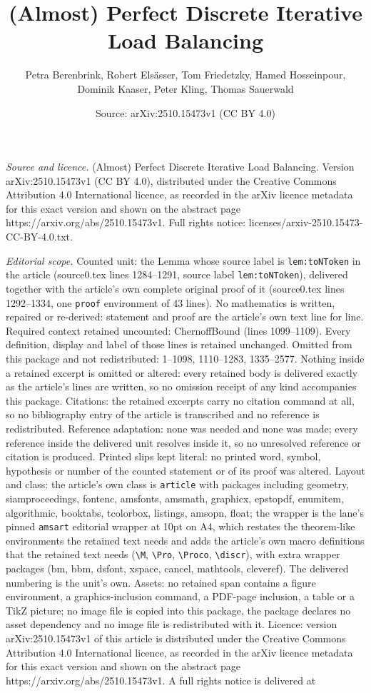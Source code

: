 \documentclass[10pt,a4paper]{amsart}
\title[(Almost) Perfect Discrete Iterative Load Balancing]{(Almost) Perfect Discrete Iterative Load Balancing}
\author{Petra Berenbrink, Robert Els\"asser, Tom Friedetzky, Hamed Hosseinpour, Dominik Kaaser, Peter Kling, Thomas Sauerwald}
\date{Source: arXiv:2510.15473v1 (CC BY 4.0)}
\begin{document}
\maketitle

\noindent\emph{Source and licence.} (Almost) Perfect Discrete Iterative Load Balancing. Version arXiv:2510.15473v1 (CC BY 4.0), distributed under the Creative Commons Attribution 4.0 International licence, as recorded in the arXiv licence metadata for this exact version and shown on the abstract page https://arxiv.org/abs/2510.15473v1. Full rights notice: licenses/arxiv-2510.15473-CC-BY-4.0.txt.\par\smallskip

\noindent\textit{Editorial scope.} Counted unit: the Lemma whose source label is \texttt{lem:toNToken} in the article (source0.tex lines 1284--1291, source label \texttt{lem:toNToken}), delivered together with the article's own complete original proof of it (source0.tex lines 1292--1334, one \texttt{proof} environment of 43 lines). No mathematics is written, repaired or re-derived: statement and proof are the article's own text line for line. Required context retained uncounted: ChernoffBound (lines 1099--1109). Every definition, display and label of those lines is retained unchanged. Omitted from this package and not redistributed: 1--1098, 1110--1283, 1335--2577. Nothing inside a retained excerpt is omitted or altered: every retained body is delivered exactly as the article's lines are written, so no omission receipt of any kind accompanies this package. Citations: the retained excerpts carry no citation command at all, so no bibliography entry of the article is transcribed and no reference is redistributed. Reference adaptation: none was needed and none was made; every reference inside the delivered unit resolves inside it, so no unresolved reference or citation is produced. Printed slips kept literal: no printed word, symbol, hypothesis or number of the counted statement or of its proof was altered. Layout and class: the article's own class is \texttt{article} with packages including geometry, siamproceedings, fontenc, amsfonts, amsmath, graphicx, epstopdf, enumitem, algorithmic, booktabs, tcolorbox, listings, amsopn, float; the wrapper is the lane's pinned \texttt{amsart} editorial wrapper at 10pt on A4, which restates the theorem-like environments the retained text needs and adds the article's own macro definitions that the retained text needs (\texttt{\textbackslash M}, \texttt{\textbackslash Pro}, \texttt{\textbackslash Proco}, \texttt{\textbackslash discr}), with extra wrapper packages (bm, bbm, dsfont, xspace, cancel, mathtools, cleveref). The delivered numbering is the unit's own. Assets: no retained span contains a figure environment, a graphics-inclusion command, a PDF-page inclusion, a table or a TikZ picture; no image file is copied into this package, the package declares no asset dependency and no image file is redistributed with it. Licence: version arXiv:2510.15473v1 of this article is distributed under the Creative Commons Attribution 4.0 International licence, as recorded in the arXiv licence metadata for this exact version and shown on the abstract page https://arxiv.org/abs/2510.15473v1. A full rights notice is delivered at 
\end{document}
